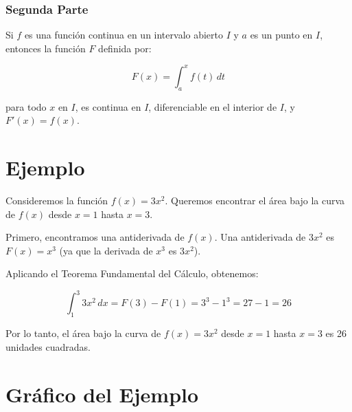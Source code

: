 \subsubsection{Segunda Parte}
Si \( f \) es una función continua en un intervalo abierto \( I \) y \( a \) es un punto en \( I \), entonces la función \( F \) definida por:

\[
F(x) = \int_a^x f(t) \, dt
\]

para todo \( x \) en \( I \), es continua en \( I \), diferenciable en el interior de \( I \), y \( F'(x) = f(x) \).

\section{Ejemplo}

Consideremos la función \( f(x) = 3x^2 \). Queremos encontrar el área bajo la curva de \( f(x) \) desde \( x = 1 \) hasta \( x = 3 \).

Primero, encontramos una antiderivada de \( f(x) \). Una antiderivada de \( 3x^2 \) es \( F(x) = x^3 \) (ya que la derivada de \( x^3 \) es \( 3x^2 \)).

Aplicando el Teorema Fundamental del Cálculo, obtenemos:

\[
\int_1^3 3x^2 \, dx = F(3) - F(1) = 3^3 - 1^3 = 27 - 1 = 26
\]

Por lo tanto, el área bajo la curva de \( f(x) = 3x^2 \) desde \( x = 1 \) hasta \( x = 3 \) es 26 unidades cuadradas.

\section{Gráfico del Ejemplo}

\begin{center}
\end{center}

